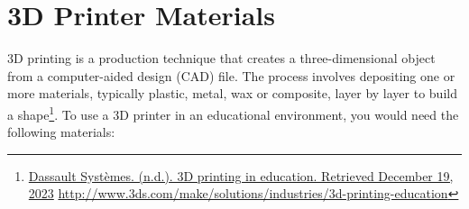 \documentclass[12pt,letterpaper,twoside]{extreport}
\begin{document}
\pagebreak
\hypertarget{d-printer-materials}{}\section{3D Printer Materials}\label{d-printer-materials}
3D printing is a production technique that creates a three-dimensional object from a computer-aided design (CAD) file. The process involves depositing one or more materials, typically plastic, metal, wax or composite, layer by layer to build a shape\footnote{\raggedright \href{http://www.3ds.com/make/solutions/industries/3d-printing-education}{Dassault Systèmes. (n.d.). 3D printing in education. Retrieved December 19, 2023} \url{http://www.3ds.com/make/solutions/industries/3d-printing-education}}. To use a 3D printer in an educational environment, you would need the following materials:
\end{document}
